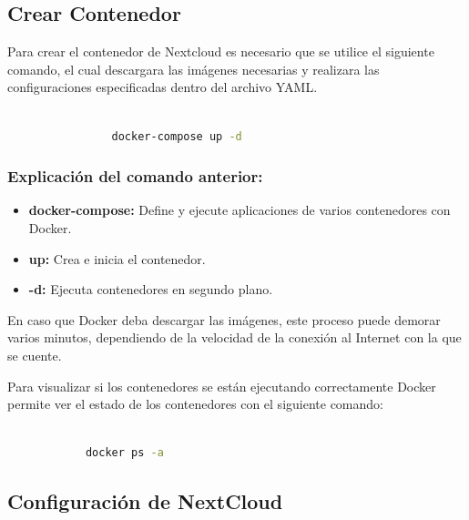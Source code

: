 			
		\subsection{Crear Contenedor}
		
			Para crear el contenedor de Nextcloud es necesario que se utilice el siguiente comando, el cual descargara las imágenes necesarias y realizara las configuraciones especificadas dentro del archivo YAML.
			
			\begin{lstlisting}[language=bash,caption=Crear Contenedor Docker]		
				
				docker-compose up -d
			\end{lstlisting}	
					
			\subsubsection{Explicación del comando anterior:}\par
			
				\begin{itemize}
				
					\item \textbf{docker-compose:} Define y ejecute aplicaciones de varios contenedores con Docker.
				
					\item \textbf{up:} Crea e inicia el contenedor.
				
					\item \textbf{-d:} Ejecuta contenedores en segundo plano.
				 
				\end{itemize}
			
			En caso que Docker deba descargar las imágenes, este proceso puede demorar varios minutos, dependiendo de la velocidad de la conexión al Internet con la que se cuente.\par
						
			Para visualizar si los contenedores se están ejecutando correctamente Docker permite ver el estado de los contenedores con el siguiente comando:
			
			\begin{lstlisting}[language=bash,caption= Estado de los contenedores]
			
			docker ps -a
			\end{lstlisting}
	
		\subsection{Configuración de NextCloud}	
			
